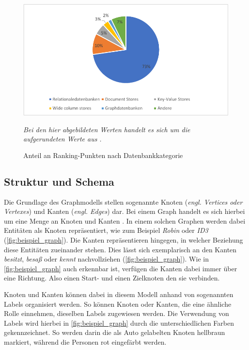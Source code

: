 \begin{figure}[ht]
    \centering
    \includegraphics[width=\textwidth]{images/marketshare_dbms.pdf}
    \caption[Anteil Ranking-Punkte nach Datenbankkategorie]{Anteil an Ranking-Punkten nach Datenbankkategorie}
    \label{fig:dbms_marketshare}
    \vspace{1em}
    \textit{Bei den hier abgebildeten Werten handelt es sich um die aufgerundeten Werte aus} \cite{db_engines_ranking_july}\textit{.}
\end{figure}

\subsection{Struktur und Schema}
\label{datenmodelle:structure}
Die Grundlage des Graphmodells stellen sogenannte Knoten (\textit{engl. Vertices oder Vertexes}) und Kanten (\textit{engl. Edges}) dar. Bei einem Graph handelt es sich hierbei um eine Menge an Knoten und Kanten \cite{gdbms}. In einem solchen Graphen werden dabei Entitäten als Knoten repräsentiert, wie zum Beispiel \textit{Robin} oder \textit{ID3} (\autoref{fig:beispiel_graph}). Die Kanten repräsentieren hingegen, in welcher Beziehung diese Entitäten zueinander stehen. Dies lässt sich exemplarisch an den Kanten \textit{besitzt}, \textit{besaß} oder \textit{kennt} nachvollziehen (\autoref{fig:beispiel_graph}). Wie in \autoref{fig:beispiel_graph} auch erkennbar ist, verfügen die Kanten dabei immer über eine Richtung. Also einen Start- und einen Zielknoten den sie verbinden. 

Knoten und Kanten können dabei in diesem Modell anhand von sogenannten Labels organisiert werden. So können Knoten oder Kanten, die eine ähnliche Rolle einnehmen, dieselben Labels zugewiesen werden. Die Verwendung von Labels wird hierbei in \autoref{fig:beispiel_graph} durch die unterschiedlichen Farben gekennzeichnet. So werden darin die als Auto gelabelten Knoten hellbraun markiert, während die Personen rot eingefärbt werden. 

